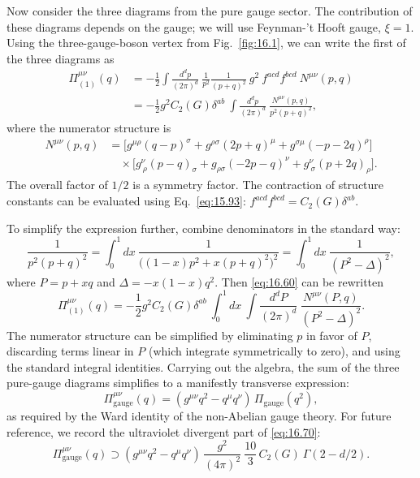Now consider the three diagrams from the pure gauge sector.  The contribution
of these diagrams depends on the gauge; we will use Feynman-'t Hooft gauge,
$\xi = 1$.  Using the three-gauge-boson vertex from Fig.~\ref{fig:16.1}, we
can write the first of the three diagrams as
\begin{equation}
  \begin{aligned}
    \Pi^{\mu\nu}_{(1)}(q) &= -\frac{1}{2}\int \frac{d^dp}{(2\pi)^d}\
      \frac{1}{p^2}\frac{1}{(p+q)^2}\ g^2\ f^{acd}f^{bcd}\ N^{\mu\nu}(p,q)\\
    &= -\frac{1}{2}g^2C_2(G)\delta^{ab}\ \int \frac{d^dp}{(2\pi)^d}\
      \frac{N^{\mu\nu}(p,q)}{p^2(p+q)^2} ,
  \end{aligned}
  \label{eq:16.60}
\end{equation}
where the numerator structure is
\begin{equation}
  \begin{aligned}
    N^{\mu\nu}(p,q) &= \bigl[ g^{\mu\rho}(q-p)^\sigma + g^{\rho\sigma}(2p+q)^\mu
      + g^{\sigma\mu}(-p-2q)^\rho \bigr]\\
    &\quad \times \bigl[ g^{\nu}_{\ \rho}(p-q)_\sigma + g_{\rho\sigma}(-2p-q)^\nu
      + g^\nu_{\ \sigma}(p+2q)_\rho \bigr] .
  \end{aligned}
\end{equation}
The overall factor of $1/2$ is a symmetry factor.  The contraction of
structure constants can be evaluated using Eq.~\eqref{eq:15.93}:
$f^{acd}f^{bcd} = C_2(G)\delta^{ab}$.

To simplify the expression further, combine denominators in the standard way:
\begin{equation}
  \frac{1}{p^2(p+q)^2} = \int_0^1 dx\ \frac{1}{\bigl( (1-x)p^2 + x(p+q)^2
    \bigr)^2} = \int_0^1 dx\ \frac{1}{(P^2-\Delta)^2} ,
  \label{eq:16.61}
\end{equation}
where $P = p + xq$ and $\Delta = -x(1-x)q^2$.  Then \eqref{eq:16.60} can be
rewritten
\begin{equation}
  \Pi^{\mu\nu}_{(1)}(q) = -\frac{1}{2}g^2C_2(G)\delta^{ab}\ \int_0^1 dx\
    \int \frac{d^dP}{(2\pi)^d}\ \frac{N^{\mu\nu}(P,q)}{(P^2-\Delta)^2} .
  \label{eq:16.62}
\end{equation}
The numerator structure can be simplified by eliminating $p$ in favor of
$P$, discarding terms linear in $P$ (which integrate symmetrically to zero),
and using the standard integral identities.  Carrying out the algebra, the
sum of the three pure-gauge diagrams simplifies to a manifestly transverse
expression:
\begin{equation}
  \Pi^{\mu\nu}_{\mathrm{gauge}}(q) = (g^{\mu\nu}q^2 - q^\mu q^\nu)\,
    \Pi_{\mathrm{gauge}}(q^2) ,
  \label{eq:16.70}
\end{equation}
as required by the Ward identity of the non-Abelian gauge theory.  For future
reference, we record the ultraviolet divergent part of \eqref{eq:16.70}:
\begin{equation}
  \Pi^{\mu\nu}_{\mathrm{gauge}}(q) \supset (g^{\mu\nu}q^2 - q^\mu q^\nu)\,
    \frac{g^2}{(4\pi)^2}\ \frac{10}{3}\,C_2(G)\ \Gamma(2-d/2) .
  \label{eq:16.71}
\end{equation}

